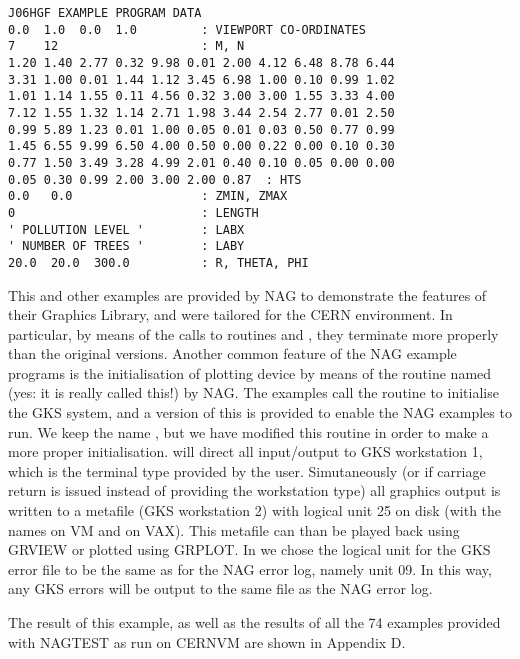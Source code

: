 \newpage
 
\begin{verbatim}
J06HGF EXAMPLE PROGRAM DATA
0.0  1.0  0.0  1.0         : VIEWPORT CO-ORDINATES
7    12                    : M, N
1.20 1.40 2.77 0.32 9.98 0.01 2.00 4.12 6.48 8.78 6.44
3.31 1.00 0.01 1.44 1.12 3.45 6.98 1.00 0.10 0.99 1.02
1.01 1.14 1.55 0.11 4.56 0.32 3.00 3.00 1.55 3.33 4.00
7.12 1.55 1.32 1.14 2.71 1.98 3.44 2.54 2.77 0.01 2.50
0.99 5.89 1.23 0.01 1.00 0.05 0.01 0.03 0.50 0.77 0.99
1.45 6.55 9.99 6.50 4.00 0.50 0.00 0.22 0.00 0.10 0.30
0.77 1.50 3.49 3.28 4.99 2.01 0.40 0.10 0.05 0.00 0.00
0.05 0.30 0.99 2.00 3.00 2.00 0.87  : HTS
0.0   0.0                  : ZMIN, ZMAX
0                          : LENGTH
' POLLUTION LEVEL '        : LABX
' NUMBER OF TREES '        : LABY
20.0  20.0  300.0          : R, THETA, PHI
\end{verbatim}
 
 
This and other examples are provided by NAG to demonstrate  the  features
of their Graphics Library, and were tailored for the CERN environment. In
particular, by  means of  the  calls to  routines  and
,
they terminate more properly than the  original versions.
Another common feature of the NAG example programs  is the initialisation
of plotting device by means of the  routine named  (yes: it
is really called this!) by NAG.
The examples call the  routine  to initialise the GKS system,
and a version  of this  is provided to  enable the NAG  examples to  run.
We keep the name , but we have
modified  this routine in order  to make a  more proper
initialisation.  will direct all input/output to
GKS workstation 1,
which is the terminal type provided by the user. Simutaneously (or if
carriage return is issued instead of providing
the workstation type) all graphics output is written to
a metafile (GKS workstation 2) with logical unit 25 on disk (with the
names  on VM and  on VAX). This
metafile can
than be played back using GRVIEW or plotted using GRPLOT.
In  we chose the logical unit for the GKS error file
to be the
same as for the NAG error log, namely unit 09. In this way, any GKS
errors will be output to the same file as the NAG error log.
 
The result of this example, as well as the results of all the 74 examples
provided with NAGTEST as run on CERNVM are shown in Appendix D.
 
